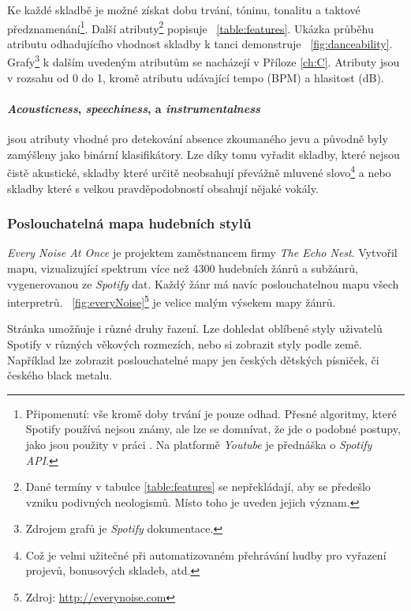 \documentclass[thesis=B, czech]{FITthesis}[2019/03/06]
\begin{document}
Ke každé skladbě je možné získat dobu trvání, tóninu, tonalitu a taktové předznamenání\footnote{Připomenutí: vše kromě doby trvání je pouze odhad. Přesné algoritmy, které Spotify používá nejsou známy, ale lze se domnívat, že jde o podobné postupy, jako jsou použity v práci \cite{Rincon}. Na platformě \textit{Youtube} je přednáška\cite{spotifyLecture} o \textit{Spotify API}.}. Další atributy\footnote{Dané termíny v tabulce \ref{table:features} se nepřekládají, aby se předešlo vzniku podivných neologismů. Místo toho je uveden jejich význam.} popisuje \tablename~\ref{table:features}. Ukázka průběhu atributu odhadujícího vhodnost skladby k tanci demonstruje \figurename~\ref{fig:danceability}. Grafy\footnote{Zdrojem grafů je \textit{Spotify} dokumentace\cite{spotifyDoc}.} k dalším uvedeným atributům se nacházejí v Příloze \ref{ch:C}. Atributy jsou v rozsahu od 0 do 1, kromě atributu udávající tempo (BPM) a hlasitost (dB).

\paragraph{\textit{Acousticness}, \textit{speechiness}, a \textit{instrumentalness}}

jsou atributy vhodné pro detekování absence zkoumaného jevu a původně byly zamýšleny jako binární klasifikátory. Lze díky tomu vyřadit skladby, které nejsou čistě akustické, skladby které určitě neobsahují převážně mluvené slovo\footnote{Což je velmi užitečné při automatizovaném přehrávání hudby pro vyřazení projevů, bonusových skladeb, atd.} a nebo skladby které s velkou pravděpodobností obsahují nějaké vokály.

\subsubsection*{Poslouchatelná mapa hudebních stylů}

\textit{Every Noise At Once} je projektem zaměstnancem firmy \textit{The Echo Nest}. Vytvořil mapu, vizualizující spektrum více než 4300 hudebních žánrů a subžánrů, vygenerovanou ze \textit{Spotify} dat. Každý žánr má navíc poslouchatelnou mapu všech interpretrů. \figurename~\ref{fig:everyNoise}\footnote{Zdroj: \url{http://everynoise.com}} je velice malým výsekem mapy žánrů.

Stránka umožňuje i různé druhy řazení. Lze dohledat oblíbené styly uživatelů Spotify v různých věkových rozmezích, nebo si zobrazit styly podle země. Například lze zobrazit poslouchatelné mapy jen českých dětských písniček, či českého black metalu.
\end{document}
